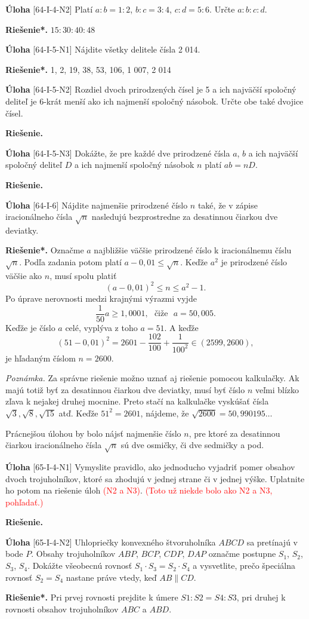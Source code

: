 \documentclass{article}
\newcommand{\rie}{\textbf{Riešenie.} }
\newcommand{\rieh}{\textbf{Riešenie*.} }
\newcommand\todo[1]{\noindent\textcolor{red}{(#1)}}
\newcommand{\problem}[3]{
  \begin{tcolorbox}[breakable,notitle,boxrule=0pt,colback=light-gray,colframe=light-gray]
    \textbf{Úloha}
    [#1] #2
  \end{tcolorbox}
  \noindent#3
}
\begin{document}
\problem{64-I-4-N2}{
 Platí $a : b = 1 : 2$, $b : c = 3 : 4$, $c : d = 5 : 6$. Určte $a : b : c : d$.
 }{
 \rieh $15 : 30 : 40 : 48$
 }


\problem{64-I-5-N1}{
Nájdite všetky delitele čísla 2 014. 
}{
\rieh 1, 2, 19, 38, 53, 106, 1 007, 2 014
}

\problem{64-I-5-N2}{
Rozdiel dvoch prirodzených čísel je 5 a ich najväčší spoločný deliteľ je 6-krát menší ako ich najmenší spoločný násobok. Určte obe také dvojice čísel.
}{
\rie 
}


\problem{64-I-5-N3}{
Dokážte, že pre každé dve prirodzené čísla $a$, $b$ a ich najväčší spoločný deliteľ $D$ a ich najmenší spoločný násobok $n$ platí $ab = nD$.
}{
\rie
}


\problem{64-I-6}{
Nájdite najmenšie prirodzené číslo $n$ také, že v zápise iracionálneho čísla $\sqrt{n}$ nasledujú bezprostredne za desatinnou čiarkou dve deviatky.
}{
\rieh Označme $a$ najbližšie väčšie prirodzené číslo k iracionálnemu číslu $\sqrt{n}$. Podľa zadania potom platí $a - 0,01 \leq \sqrt{n}$. Keďže $a^2$ je prirodzené číslo väčšie ako $n$, musí spolu platiť
$$(a - 0,01)^2 \leq n \leq  a^2 - 1.$$
Po úprave nerovnosti medzi krajnými výrazmi vyjde
$$\frac{1}{50}a \geq 1,000 1, \ \ \ \text{čiže} \ \ \  a = 50,005.$$
Keďže je číslo $a$ celé, vyplýva z toho $a = 51$. A keďže
$$(51 - 0,01)^2= 2 601 - \frac{102}{100}+\frac{1}{100^2}\in (2 599, 2 600),$$
je hľadaným číslom $n = 2 600$.

\textit{Poznámka.} Za správne riešenie možno uznať aj riešenie pomocou kalkulačky. Ak majú totiž byť za desatinnou čiarkou dve deviatky, musí byť číslo $n$ veľmi blízko zľava k nejakej druhej mocnine. Preto stačí na kalkulačke vyskúšať čísla $\sqrt{3}, \sqrt{8}, \sqrt{15}$ atď. Keďže $51^2= 2 601$, nájdeme, že $\sqrt{2 600} = 50,990 195\ldots$

Prácnejšou úlohou by bolo nájsť najmenšie číslo $n$, pre ktoré za desatinnou čiarkou iracionálneho čísla $\sqrt{n}$ sú dve osmičky, či dve sedmičky a pod.
}


\problem{65-I-4-N1}{
Vymyslite pravidlo, ako jednoducho vyjadriť pomer obsahov dvoch trojuholníkov, ktoré sa zhodujú v jednej strane či v jednej výške. Uplatnite ho potom na riešenie úloh \todo{N2 a N3}. \todo{Toto už niekde bolo ako N2 a N3, pohľadať.}
}{
\rie 
}


\problem{65-I-4-N2}{
Uhlopriečky konvexného štvoruholníka $ABCD$ sa pretínajú v bode $P$. Obsahy trojuholníkov $ABP$, $BCP$, $CDP$, $DAP$ označme postupne $S_1$, $S_2$, $S_3$, $S_4$. Dokážte všeobecnú
rovnosť $S_1 \cdot S_3 = S_2 \cdot S_4$ a vysvetlite, prečo špeciálna rovnosť $S_2 = S_4$ nastane práve vtedy, keď $AB \parallel CD$.
}{
\rieh Pri prvej rovnosti prejdite k úmere $S1 : S2 = S4 : S3$, pri druhej k rovnosti obsahov trojuholníkov $ABC$ a $ABD$.
}
\end{document}
